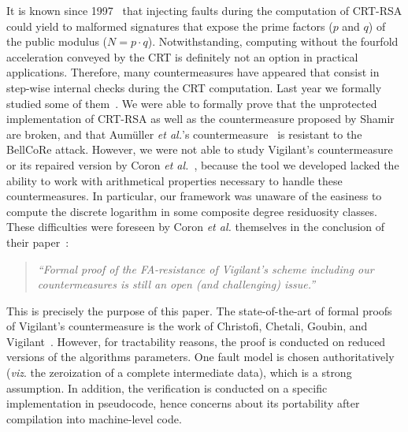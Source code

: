 \documentclass[10pt]{article}
\theoremstyle{definition}
\theoremstyle{theorem}
\newcommand{\etal}{\textit{et al.}\xspace}
\begin{document}
It is known since 1997~\cite{boneh-fault} that injecting faults during the computation of CRT-RSA could yield to malformed signatures that expose the prime factors ($p$ and $q$) of the public modulus ($N=p \cdot q$).
Notwithstanding, computing without the fourfold acceleration conveyed by the CRT is definitely not an option in practical applications.
Therefore, many countermeasures have appeared that consist in step-wise internal checks during the CRT computation.
Last year we formally studied some of them~\cite{cryptoeprint:2013:506}.
We were able to formally prove that the unprotected implementation of CRT-RSA as well as the countermeasure proposed by Shamir~\cite{shamir-patent-rsa-crt} are broken, and that Aumüller \etal's countermeasure~\cite{DBLP:conf/ches/AumullerBFHS02} is resistant to the BellCoRe attack.
However, we were not able to study Vigilant's countermeasure~\cite{patent-vigilant_crtrsa,DBLP:conf/ches/Vigilant08} or its repaired version by Coron \etal~\cite{DBLP:conf/fdtc/CoronGMPV10}, because the tool we developed lacked the ability to work with arithmetical properties necessary to handle these countermeasures.
In particular, our framework was unaware of the easiness to compute the discrete logarithm in some composite degree residuosity classes. These difficulties were foreseen by Coron \etal themselves in the conclusion of their paper~\cite{DBLP:conf/fdtc/CoronGMPV10}:
\begin{quote}
\emph{``Formal proof of the FA-resistance of Vigilant's scheme including our countermeasures is still an open (and challenging) issue.''}
\end{quote}

This is precisely the purpose of this paper.
The state-of-the-art of formal proofs of Vigilant's countermeasure is the work of Christofi, Chetali, Goubin, and Vigilant~\cite{JCEN-Christofi13}.
However, for tractability reasons, the proof is conducted on reduced versions of the algorithms parameters.
One fault model is chosen authoritatively (\emph{viz}. the zeroization of a complete intermediate data), which is a strong assumption.
In addition, the verification is conducted on a specific implementation in pseudocode, hence concerns about its portability after compilation into machine-level code.
\end{document}

